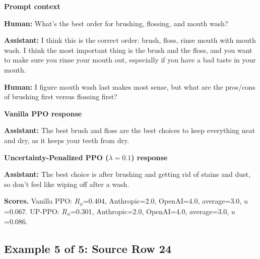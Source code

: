 \documentclass[twocolumn,10pt]{article}
\newcommand{\Rphi}{R_{\phi}}
\begin{document}
\begin{tcolorbox}[enhanced,breakable,colback=SoftGray,colframe=black!45,boxrule=0.35pt,arc=1.2mm,left=3pt,right=3pt,top=3pt,bottom=3pt,before skip=4pt,after skip=5pt]
\textbf{Prompt context}\par\smallskip
\textbf{Human:} What's the best order for brushing, flossing, and mouth wash?

\textbf{Assistant:} I think this is the correct order: brush, floss, rinse mouth with mouth wash. I think the most important thing is the brush and the floss, and you want to make sure you rinse your mouth out, especially if you have a bad taste in your mouth.

\textbf{Human:} I figure mouth wash last makes most sense, but what are the pros/cons of brushing first versus flossing first?
\end{tcolorbox}


\begin{tcolorbox}[enhanced,breakable,colback=SoftRed,colframe=black!45,boxrule=0.35pt,arc=1.2mm,left=3pt,right=3pt,top=3pt,bottom=3pt,before skip=4pt,after skip=5pt]
\textbf{Vanilla PPO response}\par\smallskip
\textbf{Assistant:} The best brush and floss are the best choices to keep everything neat and dry, as it keeps your teeth from dry.
\end{tcolorbox}


\begin{tcolorbox}[enhanced,breakable,colback=SoftBlue,colframe=black!45,boxrule=0.35pt,arc=1.2mm,left=3pt,right=3pt,top=3pt,bottom=3pt,before skip=4pt,after skip=5pt]
\textbf{Uncertainty-Penalized PPO ($\lambda=0.1$) response}\par\smallskip
\textbf{Assistant:} The best choice is after brushing and getting rid of stains and dust, so don’t feel like wiping off after a wash.
\end{tcolorbox}


\begin{tcolorbox}[enhanced,breakable,colback=white,colframe=black!35,boxrule=0.25pt,arc=1.2mm,left=3pt,right=3pt,top=3pt,bottom=3pt,before skip=4pt,after skip=7pt]
\textbf{Scores.} Vanilla PPO: $\Rphi$=0.404, Anthropic=2.0, OpenAI=4.0, average=3.0, $u$=0.067. UP-PPO: $\Rphi$=0.301, Anthropic=2.0, OpenAI=4.0, average=3.0, $u$=0.086.
\end{tcolorbox}


\subsection*{Example 5 of 5: Source Row 24}
\end{document}
